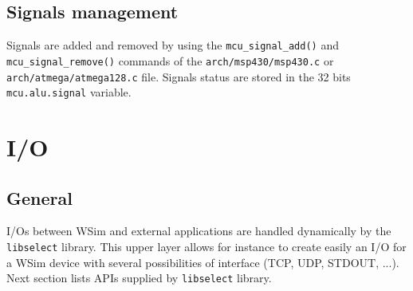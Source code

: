 \documentclass[a4paper,10pt]{report}
\begin{document}
\subsection{Signals management}
Signals are added and removed by using the \verb$mcu_signal_add()$ and \verb$mcu_signal_remove()$ commands of the \verb$arch/msp430/msp430.c$ or \verb$arch/atmega/atmega128.c$ file.
Signals status are stored in the 32 bits \verb$mcu.alu.signal$ variable.



\section{I/O}
\subsection{General}
I/Os between WSim and external applications are handled dynamically by the \verb$libselect$ library. This upper layer allows for instance to create easily an I/O for a WSim device with several possibilities of interface (TCP, UDP, STDOUT, ...). Next section lists APIs supplied by \verb$libselect$ library.
\end{document}
